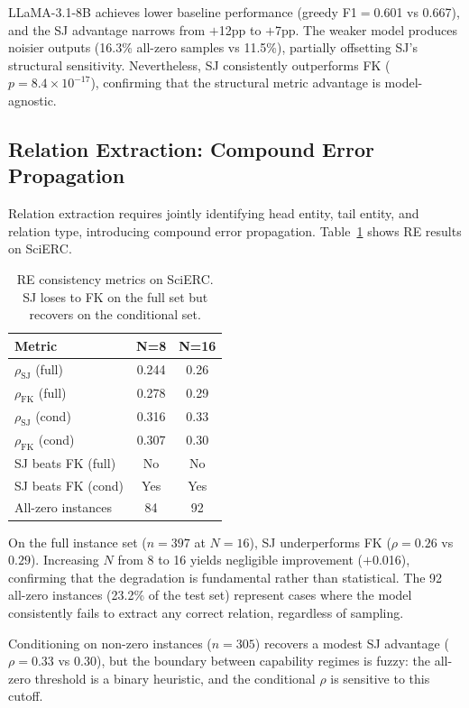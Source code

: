 \documentclass[11pt]{article}
\begin{document}
LLaMA-3.1-8B achieves lower baseline performance (greedy F1$=$0.601 vs 0.667), and the SJ advantage narrows from $+$12pp to $+$7pp.
The weaker model produces noisier outputs (16.3\% all-zero samples vs 11.5\%), partially offsetting SJ's structural sensitivity.
Nevertheless, SJ consistently outperforms FK ($p{=}8.4 \times 10^{-17}$), confirming that the structural metric advantage is model-agnostic.

\subsection{Relation Extraction: Compound Error Propagation}
\label{sec:re}

Relation extraction requires jointly identifying head entity, tail entity, and relation type, introducing compound error propagation.
Table~\ref{tab:re_n_scaling} shows RE results on SciERC.

\begin{table}[t]
\centering
\caption{RE consistency metrics on SciERC. SJ loses to FK on the full set but recovers on the conditional set.}
\label{tab:re_n_scaling}
\begin{tabular}{lcc}
\toprule
\textbf{Metric} & \textbf{N=8} & \textbf{N=16} \\
\midrule
$\rho_{\text{SJ}}$ (full)  & 0.244 & 0.26 \\
$\rho_{\text{FK}}$ (full)  & 0.278 & 0.29 \\
$\rho_{\text{SJ}}$ (cond)  & 0.316 & 0.33 \\
$\rho_{\text{FK}}$ (cond)  & 0.307 & 0.30 \\
SJ beats FK (full)          & No    & No \\
SJ beats FK (cond)          & Yes   & Yes \\
All-zero instances          & 84    & 92 \\
\bottomrule
\end{tabular}
\end{table}

On the full instance set ($n{=}397$ at $N{=}16$), SJ underperforms FK ($\rho{=}0.26$ vs $0.29$).
Increasing $N$ from 8 to 16 yields negligible improvement ($+$0.016), confirming that the degradation is fundamental rather than statistical.
The 92 all-zero instances (23.2\% of the test set) represent cases where the model consistently fails to extract any correct relation, regardless of sampling.

Conditioning on non-zero instances ($n{=}305$) recovers a modest SJ advantage ($\rho{=}0.33$ vs $0.30$), but the boundary between capability regimes is fuzzy: the all-zero threshold is a binary heuristic, and the conditional $\rho$ is sensitive to this cutoff.
\end{document}
